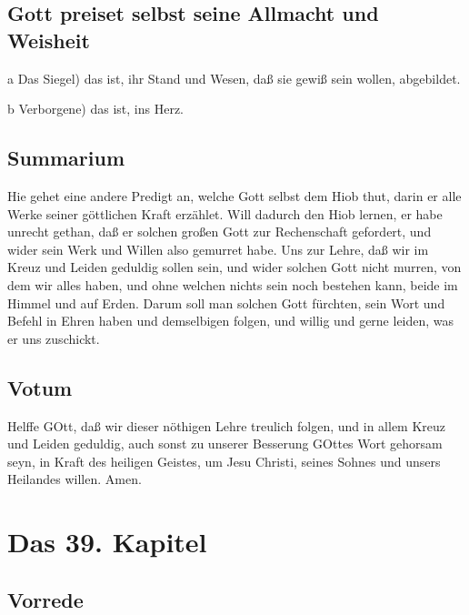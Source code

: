 \section{Gott preiset selbst seine Allmacht und Weisheit}

a Das Siegel) das ist, ihr Stand und Wesen, daß sie gewiß sein wollen, abgebildet.

b Verborgene) das ist, ins Herz.

\section{Summarium}

Hie gehet eine andere Predigt an, welche Gott selbst dem Hiob thut, darin er alle Werke seiner göttlichen Kraft erzählet. Will dadurch den
Hiob lernen, er habe unrecht gethan, daß er solchen großen Gott zur Rechenschaft gefordert, und wider sein Werk und Willen also gemurret habe. Uns zur Lehre, daß wir im Kreuz und Leiden geduldig sollen sein, und wider solchen Gott nicht murren, von dem wir alles haben, und ohne welchen nichts sein noch bestehen kann, beide im Himmel und auf Erden. Darum soll man solchen Gott fürchten, sein Wort und Befehl in Ehren haben und demselbigen folgen, und willig und gerne leiden, was er uns zuschickt.

\section{Votum}

Helffe GOtt, daß wir dieser nöthigen Lehre treulich folgen, und in allem Kreuz und Leiden geduldig, auch sonst zu unserer Besserung GOttes Wort gehorsam seyn, in Kraft des heiligen Geistes, um Jesu Christi, seines Sohnes und unsers Heilandes willen. Amen.

\chapter{Das 39. Kapitel}

\section{Vorrede}

